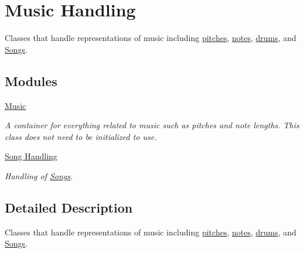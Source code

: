 \hypertarget{group___doc_music_handling}{}\section{Music Handling}
\label{group___doc_music_handling}


Classes that handle representations of music including \hyperlink{group___music_enums_ga508f69b199ea518f935486c990edac1d}{pitches}, \hyperlink{group___music_structs_struct_music_1_1_combined_note}{notes}, \hyperlink{group___music_enums_gade475b4382c7066d1af13e7c13c029b6}{drums}, and \hyperlink{class_song}{Songs}.  


\subsection*{Modules}
\begin{DoxyCompactItemize}
\item 
\hyperlink{group___doc_music}{Music}
\begin{DoxyCompactList}\small\item\em A container for everything related to music such as pitches and note lengths. This class does not need to be initialized to use. \end{DoxyCompactList}\item 
\hyperlink{group___doc_song_handling}{Song Handling}
\begin{DoxyCompactList}\small\item\em Handling of \hyperlink{class_song}{Songs}. \end{DoxyCompactList}\end{DoxyCompactItemize}


\subsection{Detailed Description}
Classes that handle representations of music including \hyperlink{group___music_enums_ga508f69b199ea518f935486c990edac1d}{pitches}, \hyperlink{group___music_structs_struct_music_1_1_combined_note}{notes}, \hyperlink{group___music_enums_gade475b4382c7066d1af13e7c13c029b6}{drums}, and \hyperlink{class_song}{Songs}. 

